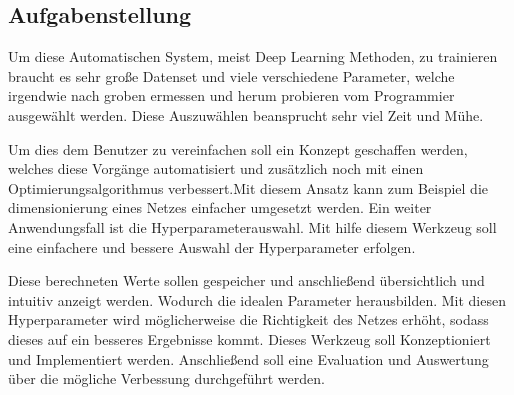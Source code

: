 \newpage
\subsection{Aufgabenstellung}
\label{sec:Aufgabenstellung}

Um diese Automatischen System, meist Deep Learning Methoden, zu trainieren braucht es sehr große Datenset und viele verschiedene Parameter, welche irgendwie nach groben ermessen und herum probieren vom Programmier ausgewählt werden. Diese Auszuwählen beansprucht sehr viel Zeit und Mühe. \par
Um dies dem Benutzer zu vereinfachen soll ein Konzept geschaffen werden, welches diese Vorgänge automatisiert und zusätzlich noch mit einen Optimierungsalgorithmus verbessert.Mit diesem Ansatz kann zum Beispiel die dimensionierung eines Netzes einfacher umgesetzt werden. Ein weiter Anwendungsfall ist die Hyperparameterauswahl. Mit hilfe diesem Werkzeug soll eine einfachere und bessere Auswahl der Hyperparameter erfolgen.\par Diese berechneten Werte sollen gespeicher und anschließend übersichtlich und intuitiv anzeigt werden. Wodurch die idealen Parameter herausbilden. Mit diesen Hyperparameter wird möglicherweise die Richtigkeit des Netzes erhöht, sodass dieses auf ein besseres Ergebnisse kommt. Dieses Werkzeug soll Konzeptioniert und Implementiert werden. Anschließend soll eine Evaluation und Auswertung über die mögliche Verbessung durchgeführt werden. 